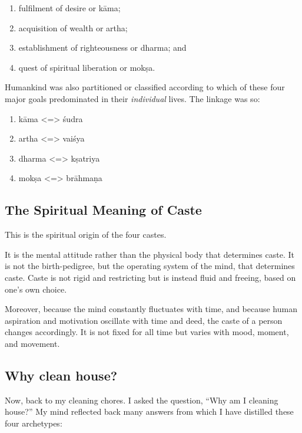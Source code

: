 \documentclass[
  a4paper,
]{article}
\begin{document}
\begin{enumerate}
\item
  fulfilment of desire or kāma;
\item
  acquisition of wealth or artha;
\item
  establishment of righteousness or dharma; and
\item
  quest of spiritual liberation or mokṣa.
\end{enumerate}

Humankind was also partitioned or classified according to which of these
four major goals predominated in their \emph{individual} lives. The
linkage was so:

\begin{enumerate}
\def\labelenumi{\arabic{enumi}.}
\item
  kāma \textless=\textgreater{} śudra
\item
  artha \textless=\textgreater{} vaiśya
\item
  dharma \textless=\textgreater{} kṣatriya
\item
  mokṣa \textless=\textgreater{} brāhmaṇa
\end{enumerate}

\subsection{The Spiritual Meaning of
Caste}\label{the-spiritual-meaning-of-caste}

This is the spiritual origin of the four castes.

It is the mental attitude rather than the physical body that determines
caste. It is not the birth-pedigree, but the operating system of the
mind, that determines caste. Caste is not rigid and restricting but is
instead fluid and freeing, based on one's own choice.

Moreover, because the mind constantly fluctuates with time, and because
human aspiration and motivation oscillate with time and deed, the caste
of a person changes accordingly. It is not fixed for all time but varies
with mood, moment, and movement.

\subsection{Why clean house?}\label{why-clean-house}

Now, back to my cleaning chores. I asked the question, ``Why am I
cleaning house?'' My mind reflected back many answers from which I have
distilled these four archetypes:
\end{document}

